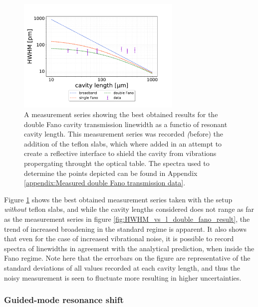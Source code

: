 \begin{figure}[h!]
    \centering
    \includegraphics[width=0.7\textwidth]{figures/results/double fano fits/HWHM_vs_cavity_length_result_2nd_measurement_only.pdf}
    \caption{A measurement series showing the best obtained results for the double Fano cavity transmission linewidth as a functio of resonant cavity length. This measurement series was recorded \emph(before) the addition of the teflon slabs, which where added in an attempt to create a reflective interface to shield the cavity from vibrations propergating throught the optical table. The spectra used to determine the points depicted can be found in Appendix \ref{appendix:Measured double Fano transmission data}.}
    \label{fig:HWHM_vs_l_double_fano_noisy}
\end{figure}

Figure \ref{fig:HWHM_vs_l_double_fano_noisy} shows the best obtained measurement series taken with the setup \emph{without} teflon slabs, and while the cavity lengths considered does not range as far as the measurement series in figure \ref{fig:HWHM_vs_l_double_fano_result}, the trend of increased broadening in the standard regime is apparent. It also shows that even for the case of increased vibrational noise, it is possible to record spectra of linewidths in agreement with the analytical prediction, when inside the Fano regime. Note here that the errorbars on the figure are representative of the standard deviations of all values recorded at each cavity length, and thus the noisy measurement is seen to fluctuate more resulting in higher uncertainties. 

\newpage
\subsubsection{Guided-mode resonance shift}

